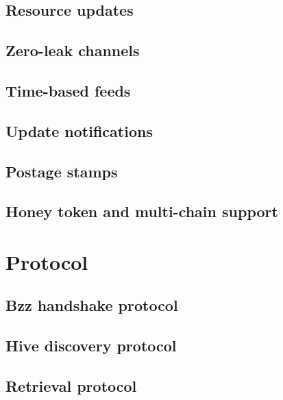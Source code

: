 \section{Resource updates}\label{spec:format:resource-updates}
%
\section{Zero-leak channels}\label{spec:format:zero-leak-channels}
%
\section{Time-based feeds}\label{spec:format:time-based-feeds}
%
\section{Update notifications}\label{spec:format:update-notifications}
%
\section{Postage stamps}\label{spec:format:postage-stamps}

\section{Honey token and multi-chain support}\label{spec:format:honey}
%


\chapter{Protocol}\label{spec:protocol}
\section{Bzz  handshake protocol}\label{spec:protocol:bzz}

\section{Hive discovery protocol}\label{spec:protocol:hive}

\section{Retrieval protocol}\label{spec:protocol:retrieval}

